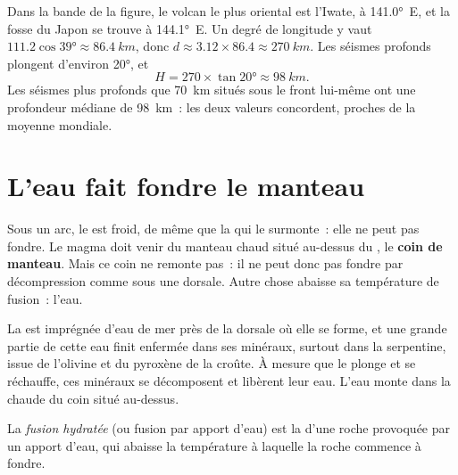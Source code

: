 \begin{example}\label{ex:g12:subduction-magmatism:japan}
Dans la bande de la figure, le volcan le plus oriental est l'Iwate, à
\ang{141.0}~E, et la fosse du Japon se trouve à \ang{144.1}~E. Un degré de
longitude y vaut $111.2\cos\ang{39} \approx \qty{86.4}{km}$, donc
$d \approx 3.12 \times 86.4
\approx \qty{270}{km}$. Les séismes profonds plongent d'environ \ang{20}, et
\[
  H = 270 \times \tan\ang{20} \approx \qty{98}{km}.
\]
Les séismes plus profonds que \qty{70}{km} situés sous le front lui-même
ont une profondeur médiane de \qty{98}{km}~: les deux valeurs concordent,
proches de la moyenne mondiale.
\end{example}

\section{L'eau fait fondre le manteau}

Sous un arc, le  est froid, de même que la  qui le surmonte~: elle ne peut pas fondre. Le magma doit venir du
manteau chaud situé au-dessus du , le \textbf{coin de manteau}. Mais
ce coin ne remonte pas~: il ne peut donc pas fondre par décompression comme
sous une dorsale. Autre chose abaisse sa température de fusion~: l'eau.

La  est imprégnée d'eau de mer près de la dorsale où elle
se forme, et une grande partie de cette eau finit enfermée dans ses
minéraux, surtout dans la serpentine, issue de l'olivine et du pyroxène de
la croûte. À mesure que le  plonge et se réchauffe, ces minéraux se
décomposent et libèrent leur eau. L'eau monte dans la  chaude du
coin situé au-dessus.

\begin{definition}\label{def:g12:subduction-magmatism:hydrous-melting}
La \emph{fusion hydratée} (ou fusion
par apport d'eau) est la  d'une roche provoquée par un
apport d'eau, qui abaisse la température à laquelle la roche commence à
fondre.
\end{definition}

